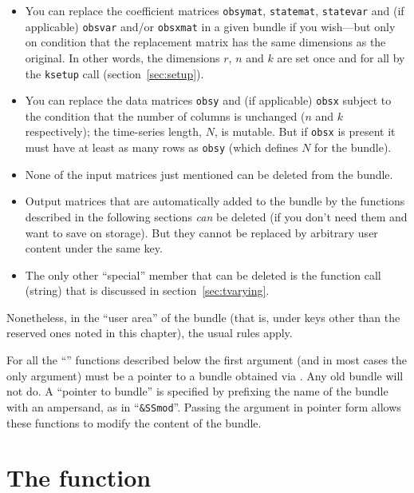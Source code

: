 \begin{itemize}
\item You can replace the coefficient matrices \texttt{obsymat},
  \texttt{statemat}, \texttt{statevar} and (if applicable)
  \texttt{obsvar} and/or \texttt{obsxmat} in a given bundle if you
  wish---but only on condition that the replacement matrix has the
  same dimensions as the original. In other words, the dimensions $r$,
  $n$ and $k$ are set once and for all by the \texttt{ksetup} call
  (section~\ref{sec:setup}).
\item You can replace the data matrices \texttt{obsy} and (if
  applicable) \texttt{obsx} subject to the condition that the number
  of columns is unchanged ($n$ and $k$ respectively); the time-series
  length, $N$, is mutable. But if \texttt{obsx} is present it must
  have at least as many rows as \texttt{obsy} (which defines $N$ for
  the bundle).
\item None of the input matrices just mentioned can be deleted from
  the bundle.
\item Output matrices that are automatically added to the bundle by
  the functions described in the following sections \textit{can} be
  deleted (if you don't need them and want to save on storage). But
  they cannot be replaced by arbitrary user content under the same
  key.
\item The only other ``special'' member that can be deleted is the
  function call (string) that is discussed in
  section~\ref{sec:tvarying}.
\end{itemize}

Nonetheless, in the ``user area'' of the bundle (that is, under keys
other than the reserved ones noted in this chapter), the usual rules
apply.

For all the ``'' functions described below the first argument
(and in most cases the only argument) must be a pointer to a bundle
obtained via . Any old bundle will not do. A ``pointer to
bundle'' is specified by prefixing the name of the bundle with an
ampersand, as in ``\verb|&SSmod|''. Passing the argument in pointer
form allows these functions to modify the content of the bundle.

\section{The  function}
\label{sec:kfilter}

